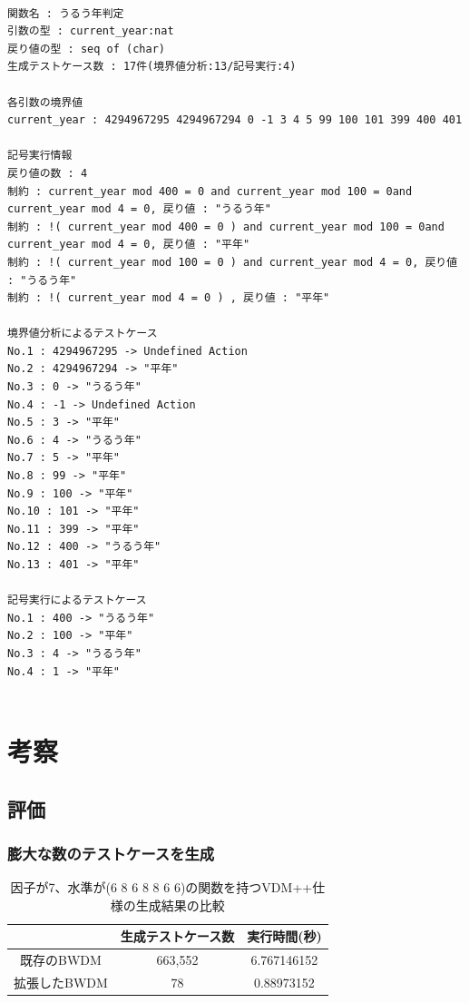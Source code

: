 \documentclass[uplatex, report, a4j, 10pt]{jsbook}
\begin{document}
\lstset{language=}
\noindent\begin{minipage}{\textwidth}
  \begin{lstlisting}[caption=拡張したBWDMにコード\ref{fig:multiple_definition}を適用した際の出力,label=fig:extended_multiple_definition]

関数名 : うるう年判定
引数の型 : current_year:nat 
戻り値の型 : seq of (char)
生成テストケース数 : 17件(境界値分析:13/記号実行:4)

各引数の境界値
current_year : 4294967295 4294967294 0 -1 3 4 5 99 100 101 399 400 401 

記号実行情報
戻り値の数 : 4
制約 : current_year mod 400 = 0 and current_year mod 100 = 0and current_year mod 4 = 0, 戻り値 : "うるう年"
制約 : !( current_year mod 400 = 0 ) and current_year mod 100 = 0and current_year mod 4 = 0, 戻り値 : "平年"
制約 : !( current_year mod 100 = 0 ) and current_year mod 4 = 0, 戻り値 : "うるう年"
制約 : !( current_year mod 4 = 0 ) , 戻り値 : "平年"

境界値分析によるテストケース
No.1 : 4294967295 -> Undefined Action
No.2 : 4294967294 -> "平年"
No.3 : 0 -> "うるう年"
No.4 : -1 -> Undefined Action
No.5 : 3 -> "平年"
No.6 : 4 -> "うるう年"
No.7 : 5 -> "平年"
No.8 : 99 -> "平年"
No.9 : 100 -> "平年"
No.10 : 101 -> "平年"
No.11 : 399 -> "平年"
No.12 : 400 -> "うるう年"
No.13 : 401 -> "平年"

記号実行によるテストケース
No.1 : 400 -> "うるう年"
No.2 : 100 -> "平年"
No.3 : 4 -> "うるう年"
No.4 : 1 -> "平年"
    
\end{lstlisting}
\end{minipage}

\chapter{考察}\label{cha:Evaluation}
\section{評価}
\subsection{膨大な数のテストケースを生成}

\begin{table}[tp]
  \begin{center}
    \caption{因子が7、水準が(6 8 6 8 8 6 6)の関数を持つVDM++仕様の生成結果の比較}
    \label{tab:pict4java_result}
    \begin{tabular}{c|c|c}
      & 生成テストケース数 & 実行時間(秒)                 \\
      \hline
      \hline
      既存のBWDM & 663,552 & 6.767146152 \\ \hline
      拡張したBWDM & 78 & 0.88973152
    \end{tabular}
  \end{center}
\end{table}
\end{document}

